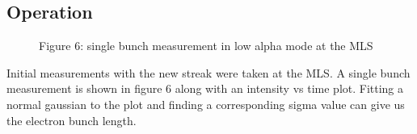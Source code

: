 \documentclass[%
 reprint,%
 amssymb, amsmath,%
 aip,cha,%
]{revtex4-1}
\begin{document}
\subsection{Operation}
\begin{figure}
\begin{center}
Figure 6: single bunch measurement in low alpha mode at the MLS
\end{center}
\end{figure}

Initial measurements with the new streak were taken at the MLS\cite{Note4}. A single bunch measurement is shown in figure 6 along with an intensity vs time plot. Fitting a normal gaussian to the plot and finding a corresponding sigma value can give us the electron bunch length.
\end{document}
